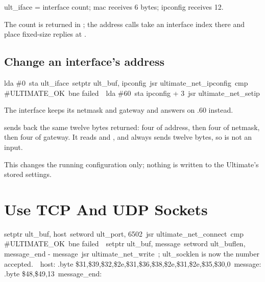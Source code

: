 \begin{resultbox}
ult_iface = interface count; mac receives 6 bytes; ipconfig receives 12.
\end{resultbox}

The count is returned in ; the address calls take an interface
index there and place fixed-size replies at .

\subsection*{Change an interface's address}

\begin{listingbox}
\hspace*{2em}lda \#0\
\hspace*{2em}sta ult\_iface\
\hspace*{2em}setptr ult\_buf, ipconfig\
\hspace*{2em}jsr ultimate\_net\_ipconfig\
\hspace*{2em}cmp \#ULTIMATE\_OK\
\hspace*{2em}bne failed\
\
\hspace*{2em}lda \#60\
\hspace*{2em}sta ipconfig + 3\
\hspace*{2em}jsr ultimate\_net\_setip
\end{listingbox}

\begin{resultbox}
The interface keeps its netmask and gateway and answers on .60 instead.
\end{resultbox}

 sends back the same twelve bytes
\cmd{ultimate\_net\_ipconfig} returned: four of address, then four of netmask,
then four of gateway. It reads  and , and always
sends twelve bytes, so  is not an input.

This changes the running configuration only; nothing is written to the
Ultimate's stored settings.

\section{Use TCP And UDP Sockets}

\begin{listingbox}
\hspace*{2em}setptr ult\_buf, host\
\hspace*{2em}setword ult\_port, 6502\
\hspace*{2em}jsr ultimate\_net\_connect\
\hspace*{2em}cmp \#ULTIMATE\_OK\
\hspace*{2em}bne failed\
\
\hspace*{2em}setptr ult\_buf, message\
\hspace*{2em}setword ult\_buflen, message\_end - message\
\hspace*{2em}jsr ultimate\_net\_write\
\hspace*{2em}; ult\_socklen is now the number accepted.\
\
host:        .byte \$31,\$39,\$32,\$2e,\$31,\$36,\$38,\$2e,\$31,\$2e,\$35,\$30,0\
message:     .byte \$48,\$49,13\
message\_end:
\end{listingbox}

